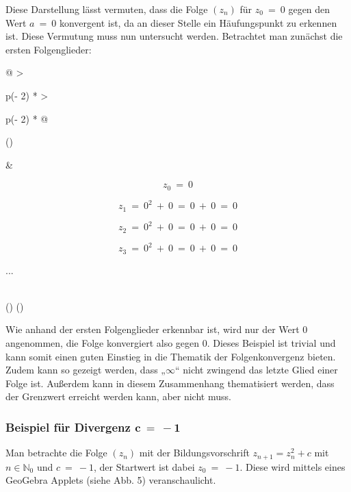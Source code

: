 \documentclass[a4paper, 12pt]{book}
\begin{document}
Diese Darstellung lässt vermuten, dass die Folge
\(\left( z_{n} \right)\) für \(z_{0}\  = \ 0\) gegen den Wert
\(a\  = \ 0\) konvergent ist, da an dieser Stelle ein Häufungspunkt zu
erkennen ist. Diese Vermutung muss nun untersucht werden. Betrachtet man
zunächst die ersten Folgenglieder:

\begin{longtable}[]{@{}
  >{\raggedright\arraybackslash}p{(\columnwidth - 2\tabcolsep) * }
  >{\raggedright\arraybackslash}p{(\columnwidth - 2\tabcolsep) * }@{}}
\toprule()
\begin{minipage}[b]{\linewidth}\raggedright
\end{minipage} & \begin{minipage}[b]{\linewidth}\raggedright
\[z_{0}\  = \ 0\]

\[z_{1}\  = \ 0^{2}\  + \ 0\  = \ 0\  + \ 0\  = \ 0\]

\[z_{2}\  = \ 0^{2}\  + \ 0\  = \ 0\  + \ 0\  = \ 0\]

\[z_{3}\  = \ 0^{2}\  + \ 0\  = \ 0\  + \ 0\  = \ 0\]

...
\end{minipage} \\
\midrule()
\endhead
\bottomrule()
\end{longtable}

Wie anhand der ersten Folgenglieder erkennbar ist, wird nur der Wert 0
angenommen, die Folge konvergiert also gegen 0. Dieses Beispiel ist
trivial und kann somit einen guten Einstieg in die Thematik der
Folgenkonvergenz bieten. Zudem kann so gezeigt werden, dass
„\(\infty\)`` nicht zwingend das letzte Glied einer Folge ist. Außerdem
kann in diesem Zusammenhang thematisiert werden, dass der Grenzwert
erreicht werden kann, aber nicht muss.

\hypertarget{beispiel-fuxfcr-divergenz-mathbfc---1}{%
\subsubsection{\texorpdfstring{Beispiel für Divergenz
\(\mathbf{c\  = \  - 1}\)}{Beispiel für Divergenz \textbackslash mathbf\{c\textbackslash{}  = \textbackslash{}  - 1\}}}\label{beispiel-fuxfcr-divergenz-mathbfc---1}}

Man betrachte die Folge \(\left( z_{n} \right)\) mit der
Bildungsvorschrift \(z_{n + 1} = z_{n}^{2} + c\) mit
\(n \in \mathbb{N}_{0}\) und \(c\  = \  - 1\), der Startwert ist dabei
\(z_{0}\  = \  - 1\). Diese wird mittels eines GeoGebra Applets (siehe
Abb. 5) veranschaulicht.
\end{document}
